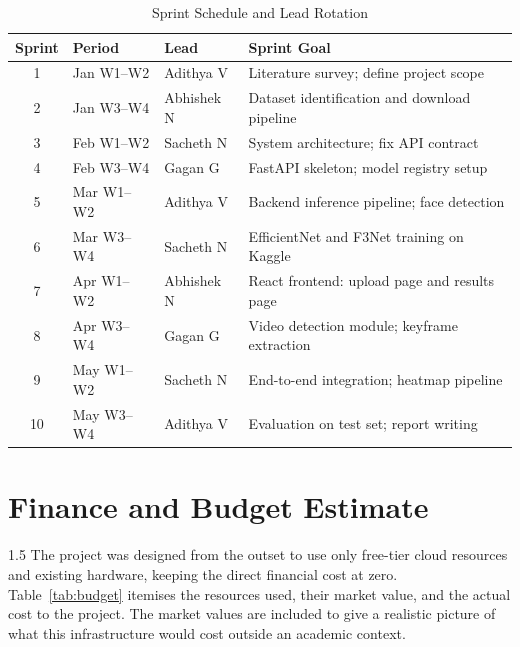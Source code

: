\renewcommand{\arraystretch}{1.35}
\begin{table}[H]
\centering
\begin{tabular}{|c|l|l|p{6.0cm}|}
\hline
\textbf{Sprint} & \textbf{Period} & \textbf{Lead} & \textbf{Sprint Goal} \\
\hline
1  & Jan W1--W2  & Adithya V  & Literature survey; define project scope \\
2  & Jan W3--W4  & Abhishek N & Dataset identification and download pipeline \\
3  & Feb W1--W2  & Sacheth N  & System architecture; fix API contract \\
4  & Feb W3--W4  & Gagan G    & FastAPI skeleton; model registry setup \\
5  & Mar W1--W2  & Adithya V  & Backend inference pipeline; face detection \\
6  & Mar W3--W4  & Sacheth N  & EfficientNet and F3Net training on Kaggle \\
7  & Apr W1--W2  & Abhishek N & React frontend: upload page and results page \\
8  & Apr W3--W4  & Gagan G    & Video detection module; keyframe extraction \\
9  & May W1--W2  & Sacheth N  & End-to-end integration; heatmap pipeline \\
10 & May W3--W4  & Adithya V  & Evaluation on test set; report writing \\
\hline
\end{tabular}
\caption{Sprint Schedule and Lead Rotation}
\label{tab:sprints}
\end{table}

\section{Finance and Budget Estimate}

\begin{spacing}{1.5}
The project was designed from the outset to use only free-tier cloud resources and existing hardware, keeping the direct financial cost at zero. Table~\ref{tab:budget} itemises the resources used, their market value, and the actual cost to the project. The market values are included to give a realistic picture of what this infrastructure would cost outside an academic context.
\end{spacing}

